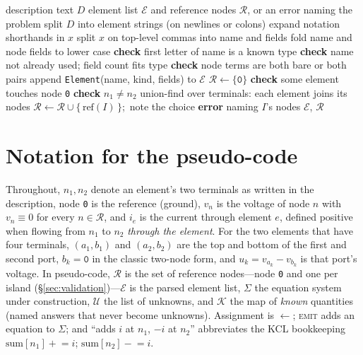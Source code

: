 \documentclass[11pt,oneside]{report}
\newcommand{\kw}[1]{\textsc{#1}}
\newcommand{\code}[1]{\texttt{#1}}
\begin{document}
\begin{algorithm}[htbp]
\caption{\kw{Parse-and-Validate}: description text to element list}
\label{alg:validate}
\begin{algorithmic}[1]
\Require description text $D$
\Ensure element list $\mathcal{E}$ and reference nodes $\mathcal{R}$,
  or an error naming the problem
\State split $D$ into element strings (on newlines or colons)
  \State expand notation shorthands in $x$
    \Comment{$\angle$, \code{[\,]}, quoted SI prefixes\ldots}
  \State split $x$ on top-level commas into name and fields
  \State fold name and node fields to lower case
  \State \textbf{check} first letter of name is a known type
  \State \textbf{check} name not already used; field count fits type
  \State \textbf{check} node terms are both bare or both pairs
  \State append \code{Element}(name, kind, fields) to $\mathcal{E}$
\EndFor
\State $\mathcal{R} \gets \{\code{0}\}$
\State \textbf{check} some element touches node \code{0}
  \State \textbf{check} $n_1 \ne n_2$
\EndFor
\State union-find over terminals: each element joins its nodes
    \State $\mathcal{R} \gets \mathcal{R} \cup \{\,\mathrm{ref}(I)\,\}$;\
      note the choice
  \Else
    \State \textbf{error} naming $I$'s nodes
  \EndIf
\EndFor
\State \Return $\mathcal{E}$, $\mathcal{R}$
\end{algorithmic}
\end{algorithm}

\section{Notation for the pseudo-code}

Throughout, $n_1, n_2$ denote an element's two terminals as written in
the description, node \code{0} is the reference (ground), $v_n$ is the
voltage of node $n$ with $v_n \equiv 0$ for every $n \in \mathcal{R}$,
and $i_e$ is the current
through element $e$, defined positive when flowing from $n_1$ to $n_2$
\emph{through the element}. For the two elements that have four
terminals, $(a_1, b_1)$ and $(a_2, b_2)$ are the top and bottom of the
first and second port, $b_k = \code{0}$ in the classic two-node form,
and $u_k = v_{a_k} - v_{b_k}$ is that port's voltage. In pseudo-code,
$\mathcal{R}$ is the set of reference nodes---node \code{0} and one
per island (\S\ref{sec:validation})---$\mathcal{E}$ is the
parsed element list, $\Sigma$ the equation system under construction,
$\mathcal{U}$ the list of unknowns, and $\mathcal{K}$ the map of
\emph{known} quantities (named answers that never become unknowns).
Assignment is $\gets$; \kw{emit} adds an equation to $\Sigma$; and
``adds $i$ at $n_1$, $-i$ at $n_2$'' abbreviates the KCL bookkeeping
$\mathrm{sum}[n_1] \mathrel{+}= i$;
$\mathrm{sum}[n_2] \mathrel{-}= i$.
\end{document}
